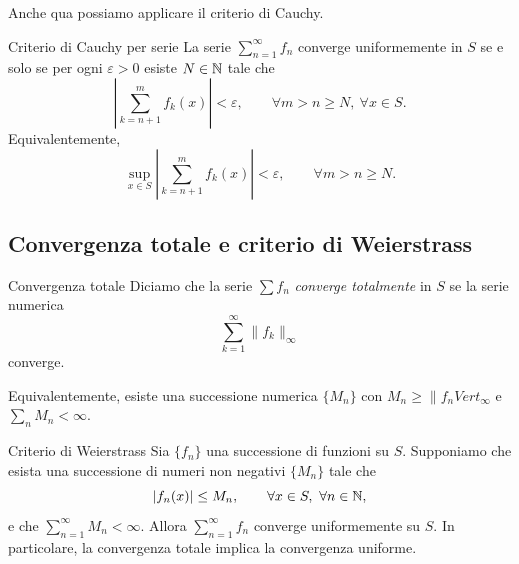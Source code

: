 \documentclass[a4paper]{article}
\begin{document}
\begin{radioactive}
Anche qua possiamo applicare il criterio di Cauchy.
\end{radioactive}

\begin{radioactive}
\begin{snippetproposition}{Criterio di Cauchy per serie}
    La serie \(\sum_{n=1}^\infty f_n\) converge uniformemente in \(S\)
    se e solo se per ogni \(\varepsilon>0\) esiste \(N\in\mathbb{N}\) tale che
    \[
        \left|\sum_{k=n+1}^{m}f_k(x)\right|<\varepsilon,
        \qquad \forall m>n\geq N,\ \forall x\in S.
    \]
    Equivalentemente,
    \[
        \sup_{x\in S}\left|\sum_{k=n+1}^{m}f_k(x)\right|<\varepsilon,
        \qquad \forall m>n\geq N.
    \]
\end{snippetproposition}
\end{radioactive}

\subsection{Convergenza totale e criterio di Weierstrass}

\begin{radioactive}
\begin{snippetdefinition}{Convergenza totale}
    Diciamo che la serie \(\sum f_n\) \emph{converge totalmente}
    in \(S\) se la serie numerica
    \[
        \sum_{k=1}^\infty\|f_k\|_\infty
    \]
    converge.
\end{snippetdefinition}
\end{radioactive}

\begin{radioactive}
Equivalentemente, esiste una successione numerica \(\{M_n\}\) con \(M_n\geq\lVert f_n
Vert_\infty\) e \(\sum_n M_n<\infty\).
\end{radioactive}

\begin{radioactive}
\begin{snippettheorem}{Criterio di Weierstrass}
    Sia \(\{f_n\}\) una successione di funzioni su \(S\). Supponiamo che esista
    una successione di numeri non negativi \(\{M_n\}\) tale che
    \[
        |f_n(x)|\leq M_n,
        \qquad \forall x\in S,\ \forall n\in\mathbb{N},
    \]
    e che \(\sum_{n=1}^\infty M_n<\infty\). Allora \(\sum_{n=1}^\infty f_n\)
    converge uniformemente su \(S\). In particolare, la convergenza totale implica
    la convergenza uniforme.
\end{snippettheorem}
\end{radioactive}
\end{document}
